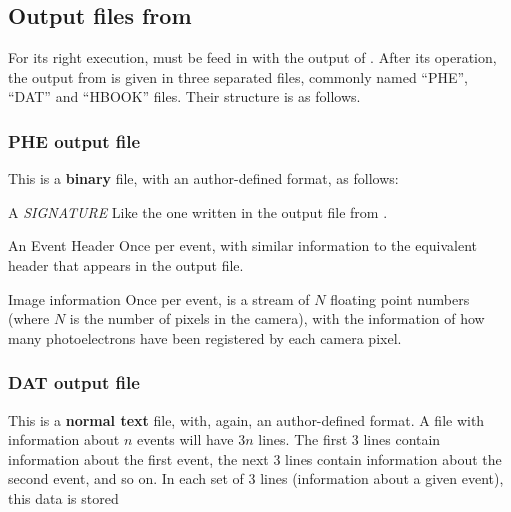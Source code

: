 \subsection{Output files from \camera}

For its right execution, \camera must be feed in with the output of
.  After its operation, the output from \camera is given in
three separated files, commonly named ``PHE'', ``DAT'' and ``HBOOK''
files. Their structure is as follows.

\subsubsection*{PHE output file}

This is a \textbf{binary} file, with an author-defined format, as
follows:

\begin{Uentry}
  
\item[A \emph{SIGNATURE}] Like the one written in the output file from
  .
  
\item[An Event Header] Once per event, with similar information to the
  equivalent header that appears in the  output file.
  
\item[Image information] Once per event, is a stream of $N$ floating
  point numbers (where $N$ is the number of pixels in the camera),
  with the information of how many photoelectrons have been registered
  by each camera pixel.
  
\end{Uentry}

\subsubsection*{DAT output file}

This is a \textbf{normal text} file, with, again, an author-defined
format. A file with information about $n$ events will have $3 n$
lines. The first 3 lines contain information about the first event,
the next 3 lines contain information about the second event, and so
on. In each set of 3 lines (information about a given event), this
data is stored

